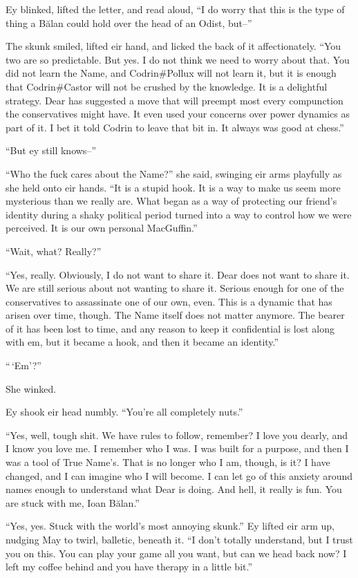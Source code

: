 Ey blinked, lifted the letter, and read aloud, ``I do worry that this is the type of thing a Bălan could hold over the head of an Odist, but--''

The skunk smiled, lifted eir hand, and licked the back of it affectionately. ``You two are so predictable. But yes. I do not think we need to worry about that. You did not learn the Name, and Codrin\#Pollux will not learn it, but it is enough that Codrin\#Castor will not be crushed by the knowledge. It is a delightful strategy. Dear has suggested a move that will preempt most every compunction the conservatives might have. It even used your concerns over power dynamics as part of it. I bet it told Codrin to leave that bit in. It always was good at chess.''

``But ey still knows--''

``Who the fuck cares about the Name?'' she said, swinging eir arms playfully as she held onto eir hands. ``It is a stupid hook. It is a way to make us seem more mysterious than we really are. What began as a way of protecting our friend's identity during a shaky political period turned into a way to control how we were perceived. It is our own personal MacGuffin.''

``Wait, what? Really?''

``Yes, really. Obviously, I do not want to share it. Dear does not want to share it. We are still serious about not wanting to share it. Serious enough for one of the conservatives to assassinate one of our own, even. This is a dynamic that has arisen over time, though. The Name itself does not matter anymore. The bearer of it has been lost to time, and any reason to keep it confidential is lost along with em, but it became a hook, and then it became an identity.''

``\,`Em'?''

She winked.

Ey shook eir head numbly. ``You're all completely nuts.''

``Yes, well, tough shit. We have rules to follow, remember? I love you dearly, and I know you love me. I remember who I was. I was built for a purpose, and then I was a tool of True Name's. That is no longer who I am, though, is it? I have changed, and I can imagine who I will become. I can let go of this anxiety around names enough to understand what Dear is doing. And hell, it really is fun. You are stuck with me, Ioan Bălan.''

``Yes, yes. Stuck with the world's most annoying skunk.'' Ey lifted eir arm up, nudging May to twirl, balletic, beneath it. ``I don't totally understand, but I trust you on this. You can play your game all you want, but can we head back now? I left my coffee behind and you have therapy in a little bit.''
